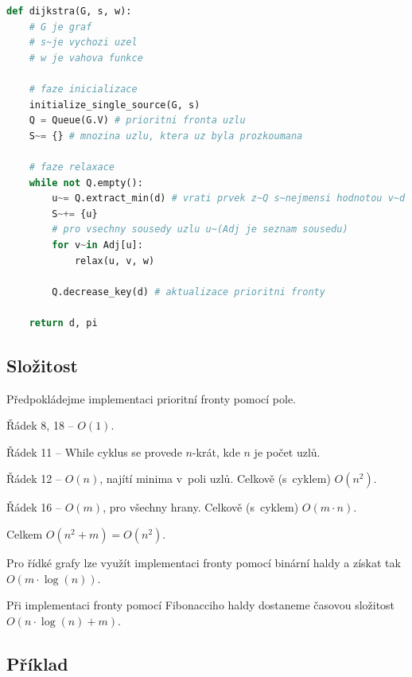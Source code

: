 \bigskip\noindent\begin{minipage}{\linewidth}
\begin{lstlisting}[language=Python, caption={Algoritmus Dijkstra.}]
def dijkstra(G, s, w):
    # G je graf
    # s~je vychozi uzel
    # w je vahova funkce

    # faze inicializace
    initialize_single_source(G, s)
    Q = Queue(G.V) # prioritni fronta uzlu
    S~= {} # mnozina uzlu, ktera uz byla prozkoumana

    # faze relaxace
    while not Q.empty():
        u~= Q.extract_min(d) # vrati prvek z~Q s~nejmensi hodnotou v~d
        S~+= {u}
        # pro vsechny sousedy uzlu u~(Adj je seznam sousedu)
        for v~in Adj[u]:
            relax(u, v, w)

        Q.decrease_key(d) # aktualizace prioritni fronty

    return d, pi
\end{lstlisting}
\end{minipage}

\subsection{Složitost}

\begin{compactitem}
    \item Předpokládejme implementaci prioritní fronty pomocí pole.
    \item Řádek 8, 18 -- $O(1)$.
    \item Řádek 11 -- While cyklus se provede $n$-krát, kde $n$ je počet uzlů.
    \item Řádek 12 -- $O(n)$, najítí minima v~poli uzlů. Celkově (s~cyklem) $O(n^2)$.
    \item Řádek 16 -- $O(m)$, pro všechny hrany. Celkově (s~cyklem) $O(m \cdot n)$.
    \item Celkem $O(n^2 + m) = O(n^2)$.
    \item Pro řídké grafy lze využít implementaci fronty pomocí binární haldy a získat tak $O(m \cdot \log(n))$.
    \item Při implementaci fronty pomocí Fibonacciho haldy dostaneme časovou složitost $O(n \cdot \log(n) + m)$.
\end{compactitem}

\subsection{Příklad}

